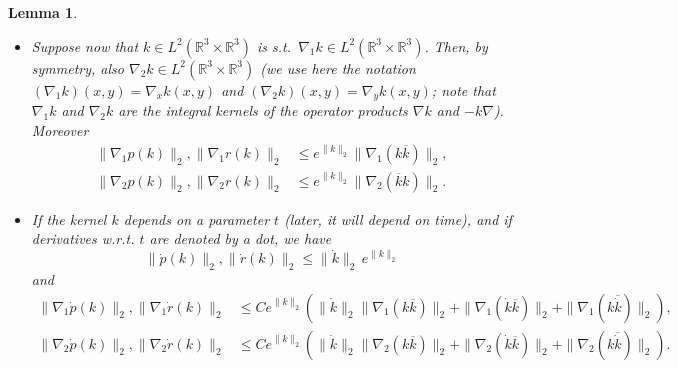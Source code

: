 \documentclass[11pt,a4paper]{article}
\newtheorem{lem}[thm]{Lemma}
\newcommand{\done}{}
\newcommand{\bR}{{\mathbb R}}
\begin{document}
\begin{lem}
\begin{itemize}
\begin{equation}
\end{equation}
\item[(iv)] Suppose now that $k \in L^2 (\bR^3 \times \bR^3)$ is s.t.\ $\nabla_1 k  \in L^2 (\bR^3 \times \bR^3)$. Then, by symmetry, also $\nabla_2 k \in L^2 (\bR^3 \times \bR^3)$ (we use here the notation $(\nabla_1 k) (x,y) = \nabla_x k (x,y)$ and $(\nabla_2 k)(x,y) = \nabla_y k (x,y)$; note that $\nabla_1 k$ and $\nabla_2 k$ are the integral kernels of the operator products $\nabla k$ and $-k \nabla$). Moreover 
\[  \begin{split}  \| \nabla_1 p (k) \|_{2} , \| \nabla_1 r (k) \|_2 & \le
e^{\| k \|_{2}} \| \nabla_1 (k \overline{k}) \|_{2}, \\
 \| \nabla_2 p (k)  \|_{2}, \| \nabla_2 r (k) \|_2 & \le e^{\| k \|_{2}} \| \nabla_2 (\overline{k} k)   \|_2.%
  \end{split} \]
\item[(v)] If the kernel $k$ depends on a parameter $t$ (later, it will depend on time), and if derivatives w.r.t. $t$ are denoted by a dot, we have
\[   \| \dot{p} (k) \|_2 , \| \dot{r} (k)\|_2  \leq \| \dot{k} \|_2 \, e^{\| k \|_2} \]
and
\[ \begin{split} 
\| \nabla_1 \dot p (k) \|_2 , \| \nabla_1 \dot r (k) \|_2  &\leq C  e^{\| k
\|_2} \left( \| \dot k \|_2 \| \nabla_1 (k\overline{k}) \|_2 + \| \nabla_1
(\dot{k} \overline{k}) \|_2 + \| \nabla_1 (k \overline{\dot{k}}) \|_2
\right),\done \\
 \| \nabla_2 \dot p (k) \|_2 , \| \nabla_2 \dot r (k) \|_2  &\leq C  e^{\| k \|_2} \left( \| \dot k \|_2 \| \nabla_2 (k\overline{k}) \|_2 + \| \nabla_2 (\dot{k} \overline{k}) \|_2 + \| \nabla_2 (k \overline{\dot{k}}) \|_2 \right).\done 
 \end{split} \]
\end{itemize}
\end{lem}
\end{document}
